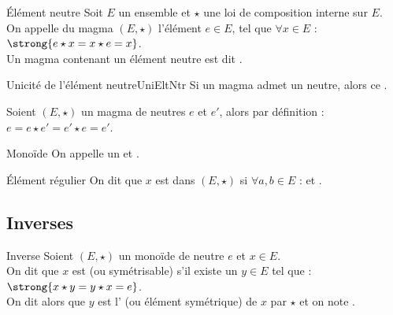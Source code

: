 \documentclass[12pt,a4paper]{report}
\begin{document}
    \begin{definition}{Élément neutre}{}
    Soit $E$ un ensemble et $\star$ une loi de composition interne sur $E$.\\
    On appelle  du magma $(E, \star)$ l'élément $e \in E$, tel que $\forall x \in E$ : $\strong{e \star x = x \star e = x}$.\\
    Un magma contenant un élément neutre est dit .
    \end{definition}
    
    \begin{proposition}{Unicité de l'élément neutre}{UniEltNtr}
    Si un magma admet un neutre, alors ce .
    \end{proposition}
    
    \begin{demo}
    Soient $(E, \star)$ un magma de neutres $e$ et $e'$, alors par définition : $ e = e \star e' = e' \star e = e' $.
    \end{demo}
    
    \begin{definition}{Monoïde}{}
    On appelle  un  et .
    \end{definition}
    
    \begin{definition}{Élément régulier}{}
    On dit que $x$ est  dans $(E, \star)$ si $\forall a, b \in E$ :  et .
    \end{definition}
    
    \vspace{-0.6cm}
    
    \subsection{Inverses}
    
    \begin{definition}{Inverse}{}
    Soient $(E, \star)$ un monoïde de neutre $e$ et $x \in E$.\\
    On dit que $x$ est  (ou symétrisable) s'il existe un $y \in E$ tel que : $\strong{x \star y = y \star x = e}$.\\
    On dit alors que $y$ est l' (ou élément symétrique) de $x$ par $\star$ et on note .
    \end{definition}
    
\end{document}
